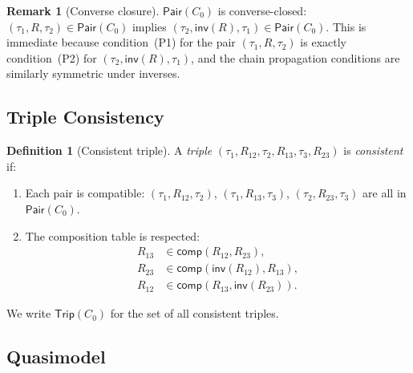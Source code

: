 \documentclass[a4paper,11pt]{article}
\theoremstyle{definition}
\newtheorem{definition}[theorem]{Definition}
\newtheorem{remark}[theorem]{Remark}
\newcommand{\inv}{\ensuremath{\mathsf{inv}}}
\newcommand{\comp}{\ensuremath{\mathsf{comp}}}
\newcommand{\Pair}{\ensuremath{\mathsf{Pair}}}
\newcommand{\Trip}{\ensuremath{\mathsf{Trip}}}
\begin{document}
\begin{remark}[Converse closure]
\label{rem:converse}
$\Pair(C_0)$ is converse-closed: $(\tau_1, R, \tau_2) \in \Pair(C_0)$
implies $(\tau_2, \inv(R), \tau_1) \in \Pair(C_0)$.  This is
immediate because condition~(P1) for the pair $(\tau_1, R, \tau_2)$
is exactly condition~(P2) for $(\tau_2, \inv(R), \tau_1)$, and the
chain propagation conditions are similarly symmetric under inverses.
\end{remark}

\subsection{Triple Consistency}

\begin{definition}[Consistent triple]
\label{def:triple}
A \emph{triple} $(\tau_1, R_{12}, \tau_2, R_{13}, \tau_3, R_{23})$ is
\emph{consistent} if:
\begin{enumerate}[label=(Tr\arabic*),nosep]
  \item Each pair is compatible: $(\tau_1, R_{12}, \tau_2)$,
    $(\tau_1, R_{13}, \tau_3)$, $(\tau_2, R_{23}, \tau_3)$ are all in
    $\Pair(C_0)$.
  \item The composition table is respected:
    \begin{align*}
      R_{13} &\in \comp(R_{12}, R_{23}), \\
      R_{23} &\in \comp(\inv(R_{12}), R_{13}), \\
      R_{12} &\in \comp(R_{13}, \inv(R_{23})).
    \end{align*}
\end{enumerate}
We write $\Trip(C_0)$ for the set of all consistent triples.
\end{definition}

\subsection{Quasimodel}
\end{document}
